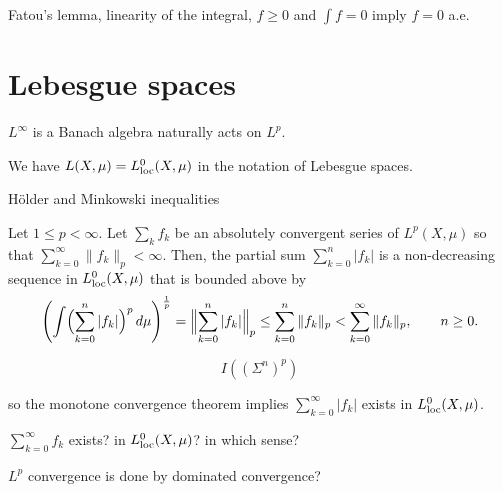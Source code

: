\documentclass{../../large}
\begin{document}
\begin{prb}
Fatou's lemma, linearity of the integral, $f\ge0$ and $\int f=0$ imply $f=0$ a.e.
\end{prb}




\begin{prb}
\end{prb}





\section{Lebesgue spaces}

$L^\infty$ is a Banach algebra naturally acts on $L^p$.

We have $L(X,\mu)=L_{\mathrm{loc}}^0(X,\mu)$ in the notation of Lebesgue spaces.

\begin{prb}
H\"older and Minkowski inequalities
\end{prb}

\begin{prb}[Completeness]
\end{prb}
\begin{pf}
Let $1\le p<\infty$.
Let $\sum_kf_k$ be an absolutely convergent series of $L^p(X,\mu)$ so that $\sum_{k=0}^\infty\|f_k\|_p<\infty$.
Then, the partial sum $\sum_{k=0}^n|f_k|$ is a non-decreasing sequence in $L_{\mathrm{loc}}^0(X,\mu)$ that is bounded above by
\[\left(\int\Bigl(\sum_{k=0}^n|f_k|\Bigr)^p\,d\mu\right)^{\frac1p}=\Bigl\|\sum_{k=0}^n|f_k|\Bigr\|_p\le\sum_{k=0}^n\|f_k\|_p<\sum_{k=0}^\infty\|f_k\|_p,\qquad n\ge0.\]

\[I((\Sigma^n)^p)\]

so the monotone convergence theorem implies $\sum_{k=0}^\infty|f_k|$ exists in $L_{\mathrm{loc}}^0(X,\mu)$.

$\sum_{k=0}^\infty f_k$ exists? in $L_{\mathrm{loc}}^0(X,\mu)$? in which sense?

$L^p$ convergence is done by dominated convergence?



\end{pf}
\end{document}
